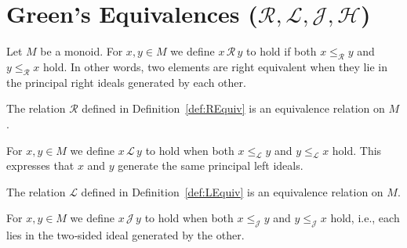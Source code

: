 
\section{Green's Equivalences (\(\mathcal R, \mathcal L, \mathcal J, \mathcal H\))}

\begin{definition}
\label{def:REquiv}
Let \(M\) be a monoid.  For \(x,y \in M\) we define \(x \,\mathcal R\, y\) to hold if both \(x \le_{\mathcal R} y\) and \(y \le_{\mathcal R} x\) hold.  In other words, two elements are right equivalent when they lie in the principal right ideals generated by each other.
\leanok
\end{definition}

\begin{lemma}
\label{lem:REquiv-isEquivalence}
The relation \(\mathcal R\) defined in Definition~\ref{def:REquiv} is an equivalence relation on \(M\).
\leanok
{}
\end{lemma}

\begin{definition}
\label{def:LEquiv}
For \(x,y\in M\) we define \(x \,\mathcal L\, y\) to hold when both \(x \le_{\mathcal L} y\) and \(y \le_{\mathcal L} x\) hold.  This expresses that \(x\) and \(y\) generate the same principal left ideals.
\leanok
\end{definition}

\begin{lemma}
\label{lem:LEquiv-isEquivalence}
The relation \(\mathcal L\) defined in Definition~\ref{def:LEquiv} is an equivalence relation on \(M\).
\leanok
{}
\end{lemma}

\begin{definition}[J equivalence]
\label{def:JEquiv}
For \(x,y\in M\) we define \(x \,\mathcal J\, y\) to hold when both \(x \le_{\mathcal J} y\) and \(y \le_{\mathcal J} x\) hold, i.e., each lies in the two‑sided ideal generated by the other.
\leanok
\end{definition}

